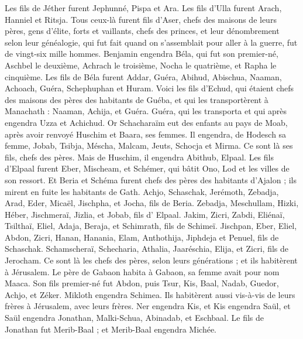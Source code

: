 \begin{multicols}{2}
Les fils de Jéther furent Jephunné, Pispa et Ara.
Les fils d'Ulla furent Arach, Hanniel et Ritsja.
Tous ceux-là furent fils d'Aser, chefs des maisons de leurs pères, gens d'élite, forts et vaillants, chefs des princes, et leur dénombrement selon leur généalogie, qui fut fait quand on s'assemblait pour aller à la guerre, fut de vingt-six mille hommes.
\VerseOne{}Benjamin engendra Béla, qui fut son premier-né, Aschbel le deuxième, Achrach le troisième,
Nocha le quatrième, et Rapha le cinquième.
Les fils de Béla furent Addar, Guéra, Abihud,
Abischua, Naaman, Achoach,
Guéra, Schephuphan et Huram.
Voici les fils d'Echud, qui étaient chefs des maisons des pères des habitants de Guéba, et qui les transportèrent à Manachath :
Naaman, Achija, et Guéra. Guéra, qui les transporta et qui après engendra Uzza et Achichud.
Or Schacharaïm eut des enfants au pays de Moab, après avoir renvoyé Huschim et Baara, ses femmes.
Il engendra, de Hodesch sa femme, Jobab, Tsibja, Méscha, Malcam,
Jeuts, Schocja et Mirma. Ce sont là ses fils, chefs des pères.
Mais de Huschim, il engendra Abithub, Elpaal.
Les fils d'Elpaal furent Eber, Mischeam, et Schémer, qui bâtit Ono, Lod et les villes de son ressort.
Et Beria et Schéma furent chefs des pères des habitants d'Ajalon ; ils mirent en fuite les habitants de Gath.
Achjo, Schaschak, Jerémoth,
Zebadja, Arad, Eder,
Micaël, Jischpha, et Jocha, fils de Beria.
Zebadja, Meschullam, Hizki, Héber,
Jischmeraï, Jizlia, et Jobab, fils d' Elpaal.
Jakim, Zicri, Zabdi,
Eliénaï, Tsilthaï, Eliel,
Adaja, Beraja, et Schimrath, fils de Schimeï.
Jischpan, Eber, Eliel,
Abdon, Zicri, Hanan,
Hanania, Elam, Anthothija,
Jiphdeja et Penuel, fils de Schaschak.
Schamscheraï, Schecharia, Athalia,
Jaaréschia, Elija, et Zicri, fils de Jerocham.
Ce sont là les chefs des pères, selon leurs générations ; et ils habitèrent à Jérusalem.
Le père de Gabaon habita à Gabaon, sa femme avait pour nom Maaca.
Son fils premier-né fut Abdon, puis Tsur, Kis, Baal, Nadab,
Guedor, Achjo, et Zéker.
Mikloth engendra Schimea. Ils habitèrent aussi vis-à-vis de leurs frères à Jérusalem, avec leurs frères.
Ner engendra Kis, et Kis engendra Saül, et Saül engendra Jonathan, Malki-Schua, Abinadab, et Eschbaal.
Le fils de Jonathan fut  Merib-Baal ; et Merib-Baal engendra Michée.

\end{multicols}
